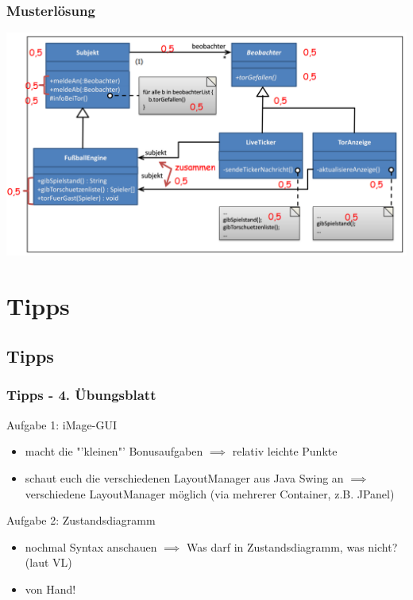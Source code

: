 \documentclass[18pt]{beamer}
\begin{document}
	\begin{frame}
		\frametitle{Musterlösung}
		\includegraphics[scale=0.35]{./pics/tut3/obs-task-sol.png}
	\end{frame}

\section{Tipps}
	\subsection{Tipps}
	\begin{frame}
		\frametitle{Tipps - 4. Übungsblatt}
			\begin{exampleblock}{Aufgabe 1: iMage-GUI}
				\begin{itemize}
					\item macht die "'kleinen"' Bonusaufgaben 
					\linebreak $\implies$ relativ leichte Punkte \pause
					\item schaut euch die verschiedenen LayoutManager aus Java Swing an
					\linebreak $\implies$ verschiedene LayoutManager möglich (via mehrerer Container, z.B. JPanel)
				\end{itemize}
			\end{exampleblock}
			
			\pause
			
			\begin{exampleblock}{Aufgabe 2: Zustandsdiagramm}
				\begin{itemize}
					\item nochmal Syntax anschauen 
					\linebreak $\implies$ Was darf in Zustandsdiagramm, was nicht? (laut VL)
					\item von Hand!
				\end{itemize}
			\end{exampleblock}
	\end{frame}
\end{document}
